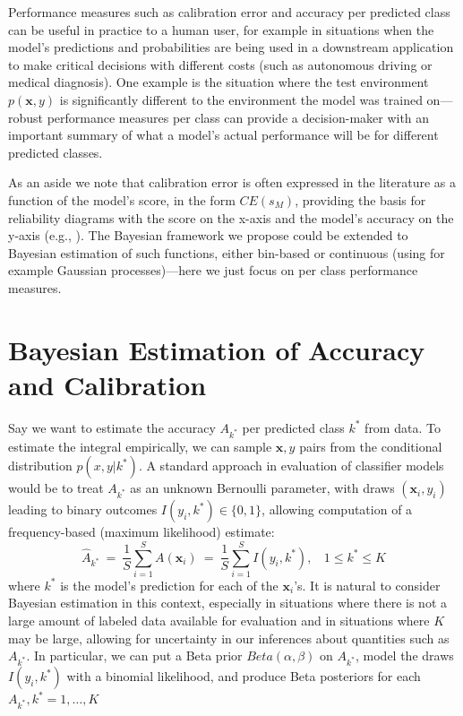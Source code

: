 \documentclass{article}
\newcommand{\ux}{{\mathbf{x}}}
\begin{document}
Performance measures such as calibration error and accuracy per predicted class can be useful in practice to a human user, for example in situations  when the model's predictions and probabilities are being used in a downstream application to make critical decisions with different costs (such as autonomous driving or medical diagnosis).
One example is the situation where the test environment $p(\ux,y)$ is significantly different to the environment the model was trained on---robust performance measures per class can provide a decision-maker with an important summary of what a model's actual performance will be for different predicted classes.

As an aside we note that calibration error is often expressed in the literature as a function of the model's score, in the form $CE(s_M)$, providing the basis for reliability diagrams with the score on the x-axis and the model's accuracy on the y-axis (e.g., \cite{guo2017calibration}).
The Bayesian framework we propose could be extended to Bayesian estimation of such functions, either bin-based or continuous (using for example Gaussian processes)---here we just focus on per class performance measures.


\section{Bayesian Estimation of Accuracy and Calibration}\label{sec:bayesian}
Say we want to estimate the accuracy ${A}_{k^*}$ per predicted class $k^*$ from data. To estimate the integral empirically, we can sample $\ux,y$ pairs from the conditional distribution $p(x,y | k^*)$.
A standard approach in evaluation of classifier models would be to treat ${A}_{k^*}$ as an unknown Bernoulli parameter, with draws $(\ux_i,y_i)$ leading to binary outcomes $I(y_i, k^*) \in \{0,1\}$, allowing computation of a frequency-based (maximum likelihood) estimate:
\[
\hat{A}_{k^*} \ = \  \frac{1}{S} \sum_{i=1}^S A(\ux_i)
 \ = \ \frac{1}{S} \sum_{i=1}^S I(y_i, k^*), \ \ \ \ 1 \le k^* \le K
\]
where $k^*$ is the model's prediction for each of the $\ux_i$'s.
It is natural to consider Bayesian estimation in this context, especially in situations where there is not a large amount of labeled data available for evaluation and in situations where $K$ may be large,  allowing for  uncertainty in our inferences about quantities such as ${A}_{k^*}$.
In particular, we can put a Beta prior $Beta(\alpha, \beta)$ on ${A}_{k^*}$, model the draws $I(y_i, k^*)$ with a binomial likelihood, and produce Beta posteriors for each ${A}_{k^*}, k^* = 1,\ldots,K$
\end{document}
